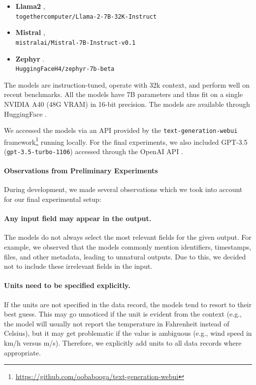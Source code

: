 \begin{itemize}
    \item \textbf{Llama2} \cite{touvron2023llama,llama-2-7b-32k},\\ \texttt{\small together\-computer\-/Llama-2-7B\--32K-Instruct}
    \item \textbf{Mistral} \cite{jiangMistral7B2023},\\ \texttt{\small mistralai/Mistral-7B-Instruct-v0.1}
    \item \textbf{Zephyr}  \cite{tunstallZephyrDirectDistillation2023}. \\ \texttt{\small HuggingFaceH4/zephyr-7b-beta}
\end{itemize}

The models are instruction-tuned, operate with 32k context, and perform well on recent benchmarks. All the models have 7B parameters and thus fit on a single NVIDIA A40 (48G VRAM) in 16-bit precision.  The models are available through HuggingFace \cite{wolf2019huggingface}.

We accessed the models via an API provided by the \texttt{text-generation-webui} framework\footnote{\url{https://github.com/oobabooga/text-generation-webui}} running locally.
For the final experiments, we also included GPT-3.5 (\texttt{gpt-3.5-turbo-1106}) accessed through the OpenAI API \cite{chatgpt}.

\paragraph{Observations from Preliminary Experiments}
\label{sec:observations}
During development, we made several observations which we took into account for our final experimental setup:

\paragraph{Any input field may appear in the output.} The models do not always select the most relevant fields for the given output. For example, we observed that the models commonly mention identifiers, timestamps, files, and other metadata, leading to unnatural outputs. Due to this, we decided not to include these irrelevant fields in the input.

\paragraph{Units need to be specified explicitly.} If the units are not specified in the data record, the models tend to resort to their best guess. This may go unnoticed if the unit is evident from the context (e.g., the model will usually not report the temperature in Fahrenheit instead of Celsius), but it may get problematic if the value is ambiguous (e.g., wind speed in km/h versus m/s). Therefore, we explicitly add units to all data records where appropriate.

